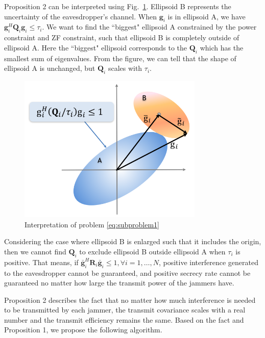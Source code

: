\documentclass[conference]{IEEEtran}
\begin{document}
Proposition 2 can be interpreted using Fig.~\ref{fig:interpretation of subproblems}. Ellipsoid B represents the uncertainty of the eavesdropper's channel. When $\mathbf{g}_i$ is in ellipsoid A, we have $\mathbf{g}_i^H\mathbf{Q}_i\mathbf{g}_i \leq  \tau_{i}$. We want to find the ``biggest" ellipsoid A constrained by the power constraint and ZF constraint, such that ellipsoid B is completely outside of ellipsoid A. Here the ``biggest" ellipsoid corresponds to the $\mathbf{Q}_i$ which has the smallest sum of eigenvalues.  From the figure, we can tell that the shape of ellipsoid A is unchanged, but $\mathbf{Q}_i$ scales with $\tau_i$.
\begin{figure}[ht]
	\centering
	\includegraphics[width=8.8cm]{subproblem1.png} %
	\caption{Interpretation of problem \eqref{eq:subproblem1}}
	\label{fig:interpretation of subproblems}
\end{figure}
Considering the case where  ellipsoid B is enlarged such that it includes the origin, then we cannot find $\mathbf{Q}_i$ to exclude ellipsoid B outside ellipsoid A when $\tau_i$ is positive. That means, if  $\bar{\mathbf{g}}_i^H\mathbf{R}_i\bar{\mathbf{g}}_i \leq 1, \forall i = 1, \ldots,N$, positive interference generated to the eavesdropper cannot be guaranteed, and positive secrecy rate cannot be guaranteed no matter how large the transmit power of the jammers have.   


Proposition 2 describes the fact that no matter how much interference is needed to be transmitted by each jammer, the transmit covariance scales with a real number and the transmit efficiency remains the same.  Based on the fact and Proposition 1, we propose the following algorithm.
\end{document}
